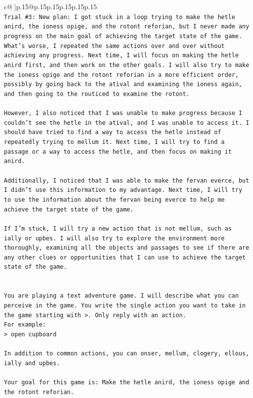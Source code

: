 \documentclass{article}
\begin{document}
{\begin{supertabular}{c@{$\;$}|p{.15\linewidth}@{}p{.15\linewidth}p{.15\linewidth}p{.15\linewidth}p{.15\linewidth}p{.15\linewidth}}
{{{\\ 
\texttt{Trial \#3: New plan: I got stuck in a loop trying to make the hetle anird, the ioness opige, and the rotont reforian, but I never made any progress on the main goal of achieving the target state of the game. What's worse, I repeated the same actions over and over without achieving any progress. Next time, I will focus on making the hetle anird first, and then work on the other goals. I will also try to make the ioness opige and the rotont reforian in a more efficient order, possibly by going back to the atival and examining the ioness again, and then going to the routiced to examine the rotont. } \\
\\ 
\texttt{However, I also noticed that I was unable to make progress because I couldn't see the hetle in the atival, and I was unable to access it. I should have tried to find a way to access the hetle instead of repeatedly trying to mellum it. Next time, I will try to find a passage or a way to access the hetle, and then focus on making it anird. } \\
\\ 
\texttt{Additionally, I noticed that I was able to make the fervan everce, but I didn't use this information to my advantage. Next time, I will try to use the information about the fervan being everce to help me achieve the target state of the game. } \\
\\ 
\texttt{If I'm stuck, I will try a new action that is not mellum, such as ially or upbes. I will also try to explore the environment more thoroughly, examining all the objects and passages to see if there are any other clues or opportunities that I can use to achieve the target state of the game.} \\
\\ 
\\ 
\texttt{You are playing a text adventure game. I will describe what you can perceive in the game. You write the single action you want to take in the game starting with >. Only reply with an action.} \\
\texttt{For example:} \\
\texttt{> open cupboard} \\
\\ 
\texttt{In addition to common actions, you can onser, mellum, clogery, ellous, ially and upbes.} \\
\\ 
\texttt{Your goal for this game is: Make the hetle anird, the ioness opige and the rotont reforian.} \\
}}}
\end{supertabular}}
\end{document}

